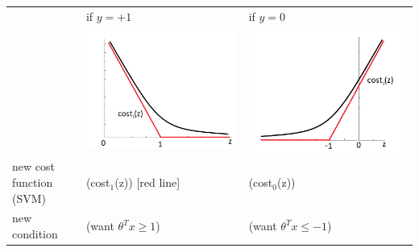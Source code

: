 \documentclass[a4paper,12pt]{report}
\begin{document}
\begin{table}
\centering
\begin{tabular}{l |l | l}
\hline
& if $y=+1$ &  if $y=0$  \\
& \includegraphics[totalheight=3 cm]{y1.png} & \includegraphics[totalheight=3 cm]{y0.png} \\
new cost function (SVM) & (cost$_1$(z)) [red line] & (cost$_0$(z)) \\
new condition & (want $\theta^T x \geq 1$) & (want $\theta^T x \leq -1$) \\
\hline
\end{tabular}
\end{table}
\end{document}
